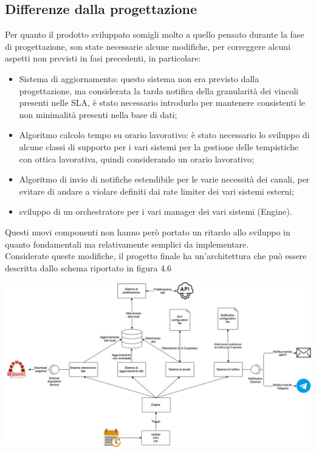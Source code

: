 	\subsection{Differenze dalla progettazione}
		Per quanto il prodotto sviluppato somigli molto a quello pensato durante la fase di progettazione, son state necessarie alcune modifiche, per correggere alcuni aspetti non previsti in fasi precedenti, in particolare:
		\begin{itemize}
			\item Sistema di aggiornamento: questo sistema non era previsto dalla progettazione, ma considerata la tarda notifica della granularità dei vincoli presenti nelle SLA, è stato necessario introdurlo per mantenere consistenti le non minimalità presenti nella base di dati;
			\item Algoritmo calcolo tempo su orario lavorativo: è stato necessario lo sviluppo di alcune classi di supporto per i vari sistemi per la gestione delle tempistiche con ottica lavorativa, quindi considerando un orario lavorativo;
			\item Algoritmo di invio di notifiche estendibile per le varie necessità dei canali, per evitare di andare a violare definiti dai rate limiter dei vari sistemi esterni;
			\item sviluppo di un orchestratore per i vari manager dei vari sistemi (Engine).
		\end{itemize}
		Questi nuovi componenti non hanno però portato un ritardo allo sviluppo in quanto fondamentali ma relativamente semplici da implementare. \\
		Considerate queste modifiche, il progetto finale ha un'architettura che può essere descritta dallo schema riportato in figura 4.6
		\begin{center}
			\includegraphics[keepaspectratio = true, width=16cm]{immagini/architettura-finale.png}
		\end{center}
		
